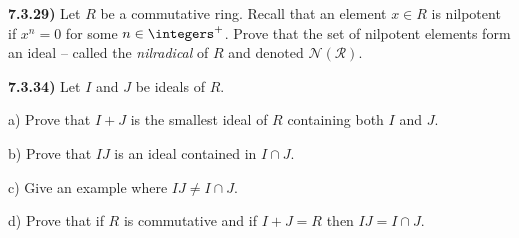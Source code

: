 \documentclass[12pt,a4paper]{article}
\newcommand{\prob}[2]{\textbf{#1)} #2}
\begin{document}
\prob{7.3.29}{
Let $R$ be a commutative ring. Recall that an element $x \in R$ is nilpotent if $x^{n} = 0$ for some $n \in \integers^{+}$. Prove that the set of nilpotent elements form an ideal -- called the \textit{nilradical} of $R$ and denoted $\mathcal{N(R)}$.
}

\prob{7.3.34}{Let $I$ and $J$ be ideals of $R$.}

a) Prove that $I+J$ is the smallest ideal of $R$ containing both $I$ and $J$.

b) Prove that $IJ$ is an ideal contained in $I \cap J$.

c) Give an example where $IJ \ne I \cap J$.

d) Prove that if $R$ is commutative and if $I + J = R$ then $IJ = I \cap J$.
\end{document}

